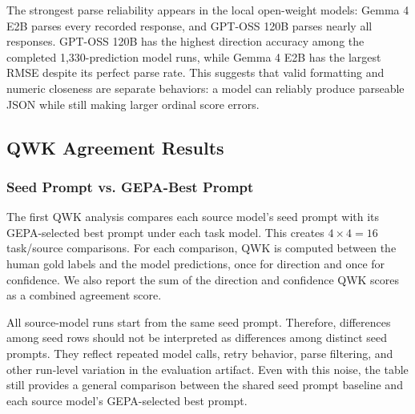 \documentclass[sigconf,screen]{acmart}
\begin{document}
The strongest parse reliability appears in the local open-weight models:
Gemma 4 E2B parses every recorded response, and GPT-OSS 120B parses nearly all
responses. GPT-OSS 120B has the highest direction accuracy among the completed
1,330-prediction model runs, while Gemma 4 E2B has the largest RMSE despite
its perfect parse rate. This suggests that valid formatting and numeric
closeness are separate behaviors: a model can reliably produce parseable JSON
while still making larger ordinal score errors.

\subsection{QWK Agreement Results}

\subsubsection{Seed Prompt vs. GEPA-Best Prompt}

The first QWK analysis compares each source model's seed prompt with its
GEPA-selected best prompt under each task model. This creates $4 \times 4 =
16$ task/source comparisons. For each comparison, QWK is computed between the
human gold labels and the model predictions, once for direction and once for
confidence. We also report the sum of the direction and confidence QWK scores
as a combined agreement score.

All source-model runs start from the same seed prompt. Therefore, differences
among seed rows should not be interpreted as differences among distinct seed
prompts. They reflect repeated model calls, retry behavior, parse filtering,
and other run-level variation in the evaluation artifact. Even with this
noise, the table still provides a general comparison between the shared seed
prompt baseline and each source model's GEPA-selected best prompt.
\end{document}
